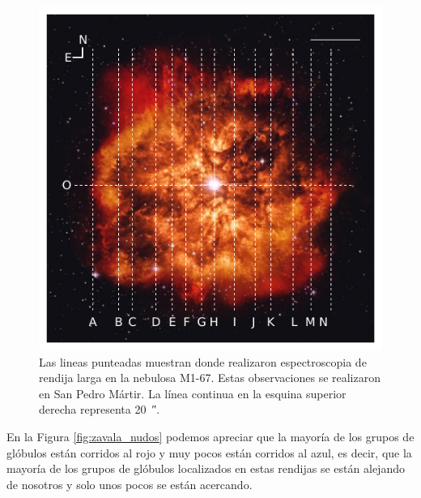 \documentclass{book}
\begin{document}
\begin{figure}[htb]
    \centering
    \includegraphics[width=\textwidth]{Nuevas imagenes finales/rendijas_zavala.pdf}
    \caption{Las lineas punteadas muestran donde \cite{Zavala:2022} realizaron espectroscopia de rendija larga en la nebulosa M1-67. Estas observaciones se realizaron en San Pedro Mártir. La línea continua en la esquina superior derecha representa \SI{20}{\arcsecond}.}
    \label{fig:zavala_rendijas_nebula}
\end{figure}

En la Figura \ref{fig:zavala_nudos} podemos apreciar que la mayoría de los grupos de glóbulos están corridos al rojo y muy pocos están corridos al azul, es decir, que la mayoría de los grupos de glóbulos localizados en estas rendijas se están alejando de nosotros y solo unos pocos se están acercando.
\end{document}
